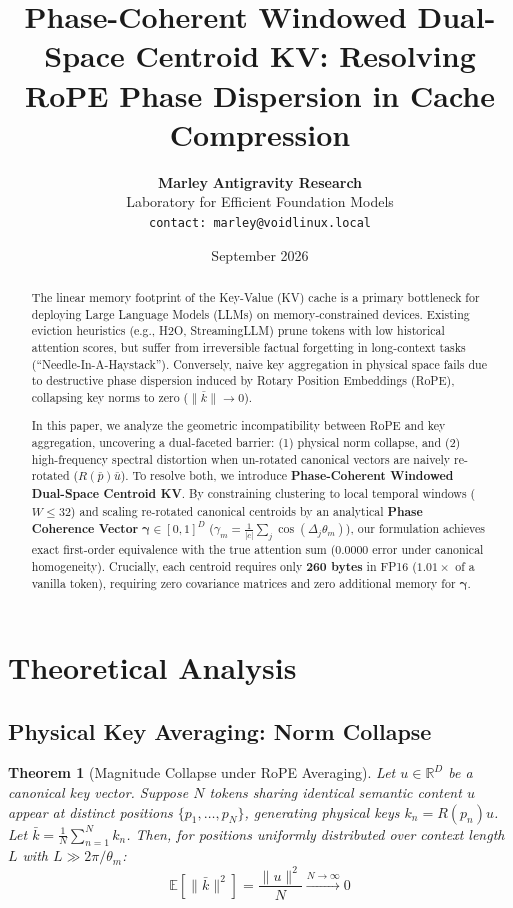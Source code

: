 \documentclass[11pt,a4paper]{article}
\title{\textbf{Phase-Coherent Windowed Dual-Space Centroid KV: Resolving RoPE Phase Dispersion in Cache Compression}}
\author{\textbf{Marley} \quad \textbf{Antigravity Research}\\
Laboratory for Efficient Foundation Models\\
\texttt{contact: marley@voidlinux.local}}
\date{September 2026}
\newtheorem{theorem}{Theorem}
\begin{document}
\maketitle

\begin{abstract}
The linear memory footprint of the Key-Value (KV) cache is a primary bottleneck for deploying Large Language Models (LLMs) on memory-constrained devices. Existing eviction heuristics (e.g., H2O, StreamingLLM) prune tokens with low historical attention scores, but suffer from irreversible factual forgetting in long-context tasks (``Needle-In-A-Haystack''). Conversely, naive key aggregation in physical space fails due to destructive phase dispersion induced by Rotary Position Embeddings (RoPE), collapsing key norms to zero ($\|\bar{k}\| \to 0$).

In this paper, we analyze the geometric incompatibility between RoPE and key aggregation, uncovering a dual-faceted barrier: (1) physical norm collapse, and (2) high-frequency spectral distortion when un-rotated canonical vectors are naively re-rotated ($R(\bar{p})\bar{u}$). To resolve both, we introduce \textbf{Phase-Coherent Windowed Dual-Space Centroid KV}. By constraining clustering to local temporal windows ($W \le 32$) and scaling re-rotated canonical centroids by an analytical \textbf{Phase Coherence Vector} $\boldsymbol{\gamma} \in [0, 1]^D$ ($\gamma_m = \frac{1}{|c|}\sum_{j}\cos(\Delta_j \theta_m)$), our formulation achieves exact first-order equivalence with the true attention sum ($0.0000$ error under canonical homogeneity). Crucially, each centroid requires only \textbf{260 bytes} in FP16 ($1.01\times$ of a vanilla token), requiring zero covariance matrices and zero additional memory for $\boldsymbol{\gamma}$.
\end{abstract}

\section{Theoretical Analysis}

\subsection{Physical Key Averaging: Norm Collapse}
\begin{theorem}[Magnitude Collapse under RoPE Averaging]
Let $u \in \mathbb{R}^{D}$ be a canonical key vector. Suppose $N$ tokens sharing identical semantic content $u$ appear at distinct positions $\{p_1, \dots, p_N\}$, generating physical keys $k_n = R(p_n) u$. Let $\bar{k} = \frac{1}{N} \sum_{n=1}^N k_n$.
Then, for positions uniformly distributed over context length $L$ with $L \gg 2\pi / \theta_m$:
\begin{equation}
\mathbb{E}[\|\bar{k}\|^2] = \frac{\|u\|^2}{N} \xrightarrow{N \to \infty} 0
\end{equation}
\end{theorem}
\end{document}
